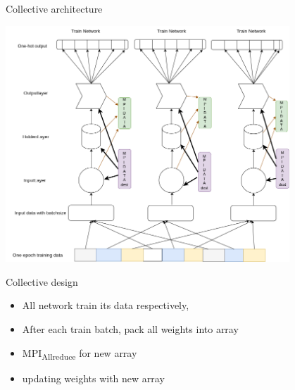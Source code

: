 \documentclass[presentation]{beamer}
\begin{document}
\begin{frame}[label={sec:org8a3f73e}]{Collective architecture}
\begin{center}
\includegraphics[width=0.8\textwidth]{./png/MPINetworkAllreduce.png}
\end{center}
\end{frame}
\begin{frame}[label={sec:org26736c9}]{Collective design}
\begin{itemize}
\item All network train its data respectively,
\item After each train batch, pack all weights into array
\item MPI\textsubscript{Allreduce} for new array
\item updating weights with  new array
\end{itemize}
\end{frame}
\end{document}
